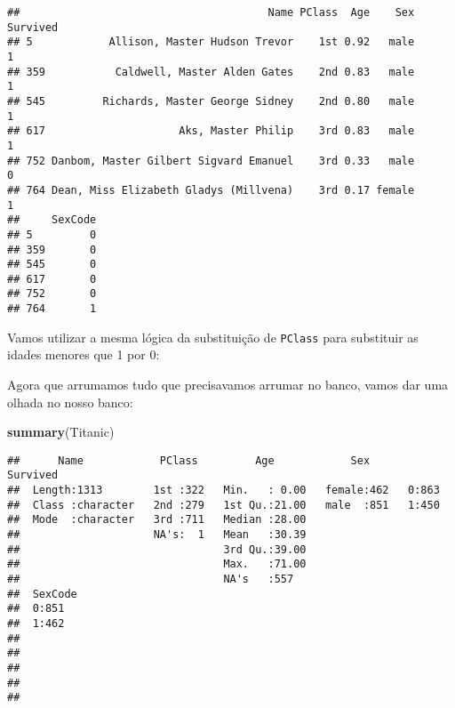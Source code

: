 \documentclass[]{book}
\newenvironment{Shaded}{\begin{snugshade}}{\end{snugshade}}
\newcommand{\DecValTok}[1]{\textcolor[rgb]{0.00,0.00,0.81}{#1}}
\newcommand{\KeywordTok}[1]{\textcolor[rgb]{0.13,0.29,0.53}{\textbf{#1}}}
\newcommand{\NormalTok}[1]{#1}
\newcommand{\OperatorTok}[1]{\textcolor[rgb]{0.81,0.36,0.00}{\textbf{#1}}}
\newcommand{\StringTok}[1]{\textcolor[rgb]{0.31,0.60,0.02}{#1}}
\theoremstyle{definition}
\theoremstyle{definition}
\theoremstyle{definition}
\theoremstyle{remark}
\begin{document}
\begin{Shaded}
\end{Shaded}

\begin{verbatim}
##                                       Name PClass  Age    Sex Survived
## 5            Allison, Master Hudson Trevor    1st 0.92   male        1
## 359           Caldwell, Master Alden Gates    2nd 0.83   male        1
## 545         Richards, Master George Sidney    2nd 0.80   male        1
## 617                     Aks, Master Philip    3rd 0.83   male        1
## 752 Danbom, Master Gilbert Sigvard Emanuel    3rd 0.33   male        0
## 764 Dean, Miss Elizabeth Gladys (Millvena)    3rd 0.17 female        1
##     SexCode
## 5         0
## 359       0
## 545       0
## 617       0
## 752       0
## 764       1
\end{verbatim}

Vamos utilizar a mesma lógica da substituição de \texttt{PClass} para substituir as idades menores que 1 por 0:

\begin{Shaded}
\end{Shaded}

Agora que arrumamos tudo que precisavamos arrumar no banco, vamos dar uma olhada no nosso banco:

\begin{Shaded}
\begin{Highlighting}[]
\KeywordTok{summary}\NormalTok{(Titanic)}
\end{Highlighting}
\end{Shaded}

\begin{verbatim}
##      Name            PClass         Age            Sex      Survived
##  Length:1313        1st :322   Min.   : 0.00   female:462   0:863   
##  Class :character   2nd :279   1st Qu.:21.00   male  :851   1:450   
##  Mode  :character   3rd :711   Median :28.00                        
##                     NA's:  1   Mean   :30.39                        
##                                3rd Qu.:39.00                        
##                                Max.   :71.00                        
##                                NA's   :557                          
##  SexCode
##  0:851  
##  1:462  
##         
##         
##         
##         
## 
\end{verbatim}
\end{document}
